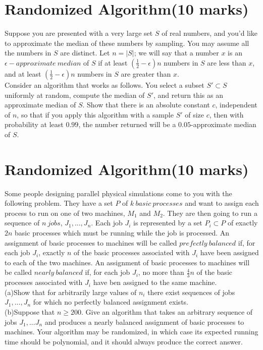 \documentclass[a4paper,11pt]{article}
\begin{document}
\section{Randomized Algorithm(10 marks)}

Suppose you are presented with a very large set $S$ of real numbers, and you'd like to approximate the median of these numbers by sampling. You may assume all the numbers in $S$ are distinct. Let $n=|S|$; we will say that a number $x$ is an $\epsilon -approximate\ median$ of $S$ if at least $(\frac{1}{2}-\epsilon)n$ numbers in $S$ are less than $x$, and at least $(\frac{1}{2}-\epsilon)n$ numbers in $S$ are greater than $x$.\\

		Consider an algorithm that works as follows. You select a subset $S'\subset S$ uniformly at random, compute the median of $S'$, and return this as an approximate median of $S$. Show that there is an absolute constant $c$, independent of $n$, so that if you apply this algorithm with a sample $S'$ of size $c$, then with probability at least $0.99$, the number returned will be a $0.05$-approximate median of $S$.

\section{Randomized Algorithm(10 marks)}

Some people designing parallel physical simulations come to you with the following problem. They have a set $P$ of $k\ basic\ processes$ and want to assign each process to run on one of two machines, $M_1$ and $M_2$. They are then going to run a sequence of $n\ jobs$, $J_1,...,J_n$. Each job $J_i$ is represented by a set $P_i\subset P$ of exactly $2n$ basic processes which must be running while the job is processed. An assignment of basic processes to machines will be called $prefectly\ balanced$ if, for each job $J_i$, exactly $n$ of the basic processes associated with $J_i$ have been assigned to each of the two machines. An assignment of basic processes to machines will be called $nearly\ balanced$ if, for each job $J_i$, no more than $\frac{4}{3}n$ of the basic processes associated with $J_i$ have ben assigned to the same machine.\\

	 (a)Show that for arbitrarily large values of $n_i$ there exist sequences of jobs $J_1,...,J_n$ for which no perfectly balanced assignment exists.\\

	 (b)Suppose that $n\geq 200$. Give an algorithm that takes an arbitrary sequence of jobs $J_1,...J_n$ and produces a nearly balanced assignment of basic processes to machines. Your algorithm may be randomized, in which case its expected running time should be polynomial, and it should always produce the correct answer.
\end{document}
